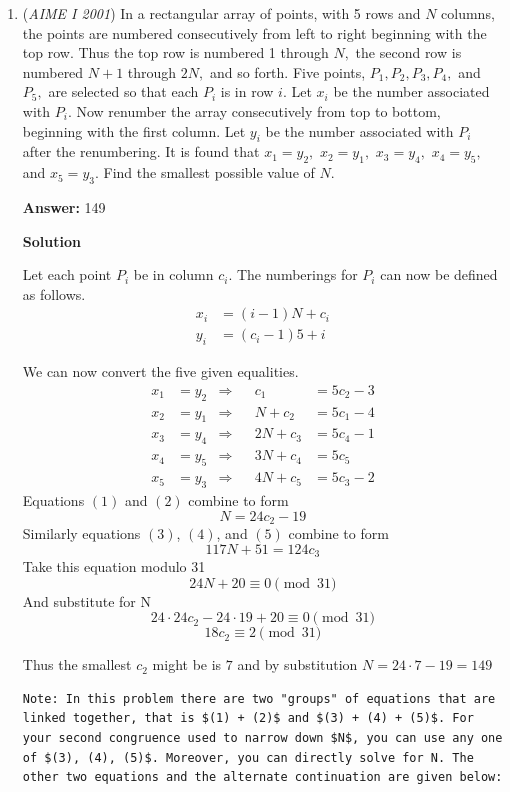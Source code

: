 \begin{enumerate}
 
Solution by jackshi2006

 


	\item (\textit{AIME I 2001}) In a rectangular array of points, with 5 rows and $N$ columns, the points are numbered consecutively from left to right beginning with the top row.  Thus the top row is numbered 1 through $N,$ the second row is numbered $N + 1$ through $2N,$ and so forth.  Five points, $P_1, P_2, P_3, P_4,$ and $P_5,$ are selected so that each $P_i$ is in row $i.$  Let $x_i$ be the number associated with $P_i.$  Now renumber the array consecutively from top to bottom, beginning with the first column.  Let $y_i$ be the number associated with $P_i$ after the renumbering.  It is found that $x_1 = y_2,$ $x_2 = y_1,$ $x_3 = y_4,$ $x_4 = y_5,$ and $x_5 = y_3.$  Find the smallest possible value of $N.$

 \textbf{Answer: }149



\textbf{Solution}

Let each point $P_i$ be in column $c_i$. The numberings for $P_i$ can now be defined as follows.
 \begin{align*}x_i &= (i - 1)N + c_i\\ y_i &= (c_i - 1)5 + i \end{align*}


 We can now convert the five given equalities.
 \begin{align}x_1&=y_2 & \Longrightarrow & & c_1 &= 5 c_2-3\\ x_2&=y_1 & \Longrightarrow & & N+c_2 &= 5 c_1-4\\ x_3&=y_4 & \Longrightarrow & & 2 N+c_3 &= 5 c_4-1\\ x_4&=y_5 & \Longrightarrow & & 3 N+c_4 &= 5 c_5\\ x_5&=y_3 & \Longrightarrow & & 4 N+c_5 &= 5 c_3-2 \end{align}Equations $(1)$ and $(2)$ combine to form
 \[N = 24c_2 - 19\]Similarly equations $(3)$, $(4)$, and $(5)$ combine to form
 \[117N +51 = 124c_3\]Take this equation modulo 31
 \[24N+20\equiv 0 \pmod{31}\]And substitute for N
 \[24 \cdot 24 c_2 - 24 \cdot 19 +20\equiv 0 \pmod{31}\]
 \[18 c_2 \equiv 2 \pmod{31}\]

 Thus the smallest $c_2$ might be is $7$ and by substitution $N = 24 \cdot 7 - 19 = 149$
\begin{verbatim}
Note: In this problem there are two "groups" of equations that are linked together, that is $(1) + (2)$ and $(3) + (4) + (5)$. For your second congruence used to narrow down $N$, you can use any one of $(3), (4), (5)$. Moreover, you can directly solve for N. The other two equations and the alternate continuation are given below:
\end{verbatim}


\end{enumerate}
